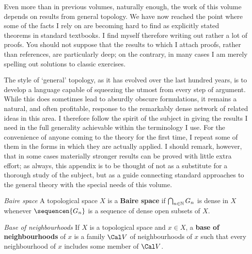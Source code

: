 
\def\Cech{{\smc \v{C}ech 66}}
\def\Csaszar{{\smc Cs\'asz\'ar 78}}
\def\Engelking{{\smc Engelking 89}}
\def\Gaal{{\smc Gaal 64}}
\def\Kuratowski{{\smc Kuratowski 66}}
\def\Kechris{{\smc Kechris 95}}

\def\glitem#1{{\it #1}\enskip}

\def\chaptername{Appendix}
\def\sectionname{General topology}


Even more than in previous volumes, naturally enough, the work of this
volume depends on results from general topology.   We have now reached
the point where some of the facts I rely on are becoming hard
to find as explicitly stated theorems in standard textbooks.   I find
myself therefore writing out rather a lot of proofs.   You should not
suppose that the results to which I attach proofs, rather than
references, are particularly deep;  on the contrary, in many cases I am
merely spelling out solutions to classic exercises.

The style of `general' topology, as it has evolved over the last hundred
years, is to develop a language capable of squeezing the utmost from
every step of argument.   While this does sometimes lead to absurdly
obscure formulations, it remains a natural, and often profitable,
response to the remarkably dense network of related ideas in this area.
I therefore follow the spirit of the subject in giving the results I
need in the full generality achievable within the terminology I use.
For the convenience of anyone coming to the theory for the first time,
I repeat some of them in the forms in which they are actually applied.
I should remark, however, that in some cases materially stronger results
can be proved with little extra effort;  as always, this appendix is to
be thought of not as a substitute for a thorough study of the subject,
but as a guide connecting standard approaches to the general theory with
the special needs of this volume.


\glitem{Baire space} A topological space $X$ is a {\bf Baire space} if
$\bigcap_{n\in\Bbb N}G_n$ is dense in $X$ whenever $\sequencen{G_n}$ is a
sequence of dense open subsets of $X$.

\glitem{Base of neighbourhoods} If $X$ is a topological space and
$x\in X$,
a {\bf base of neighbourhoods} of $x$ is a family $\Cal V$ of
neighbourhoods of $x$ such that
every neighbourhood of $x$ includes some member of $\Cal V$.

